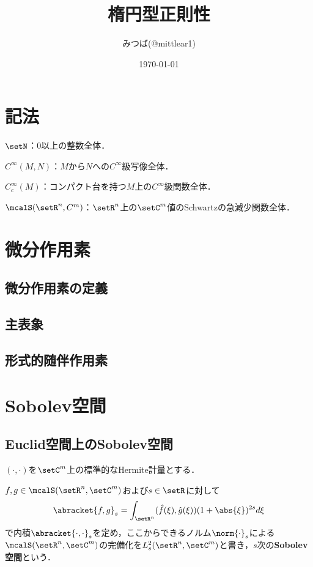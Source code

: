 \documentclass[uplatex,dvipdfmx]{jsarticle}
\title{楕円型正則性}
\author{みつば(@mittlear1)}
\date{\today}
\newcommand{\smooth}{$C^{\infty}$級}
\newcommand{\sobolev}[1]{L^{2}_{#1}}
\newcommand{\sobolevlocal}[3]{\sobolev{#1}(\setR^{#2},\setC^{#3})}
\newcommand{\schwartz}[2]{\mcalS(\setR^{#1},\setC^{#2})}
\newcommand{\dd}{d} %
\begin{document}
\maketitle
\tableofcontents

\newpage
\section*{記法}
$\setN$：0以上の整数全体．

$C^\infty(M,N)$：$M$から$N$への\smooth 写像全体．

$C^{\infty}_c(M)$：コンパクト台を持つ$M$上の\smooth 関数全体．

$\mcalS(\setR^n,C^m)$：$\setR^n$上の$\setC^m$値のSchwartzの急減少関数全体．



\newpage
\section{微分作用素}

\subsection{微分作用素の定義}

\subsection{主表象}

\subsection{形式的随伴作用素}

\newpage
\section{Sobolev空間}

\subsection{Euclid空間上のSobolev空間}

$(\cdot,\cdot)$を$\setC^m$上の標準的なHermite計量とする．

\begin{definition}
  $f, g\in \schwartz{n}{m}$および$s\in \setR$に対して
  \[ \abracket{f,g}_s=\int_{\setR^n} (\hat{f}(\xi),\hat{g}(\xi))(1+\abs{\xi})^{2s}\dd \xi \]
で内積$\abracket{\cdot,\cdot}_s$を定め，ここからできるノルム$\norm{\cdot}_s$による
$\schwartz{n}{m}$の完備化を$\sobolevlocal{s}{n}{m}$と書き，$s$次の\textbf{Sobolev空間}という．
\end{definition}
\end{document}
